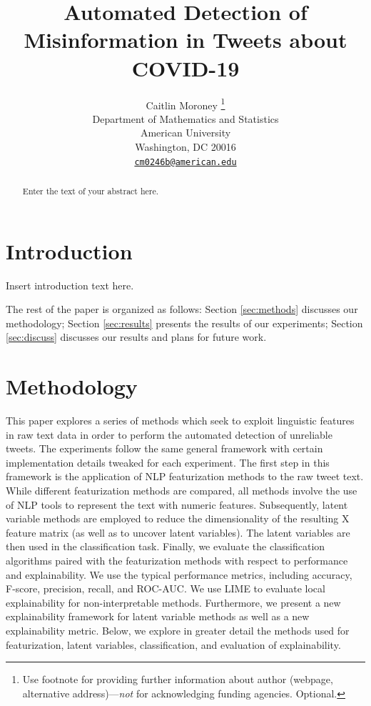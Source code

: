 \documentclass{article}
\title{Automated Detection of Misinformation in Tweets about COVID-19}
\author{
    Caitlin Moroney
    \thanks{Use footnote for providing further information about author (webpage,
alternative address)---\emph{not} for acknowledging funding agencies.
Optional.}
   \\
    Department of Mathematics and Statistics \\
    American University \\
  Washington, DC 20016 \\
  \texttt{\href{mailto:cm0246b@american.edu}{\nolinkurl{cm0246b@american.edu}}} \\
  }
\begin{document}
\maketitle

\def\tightlist{}


\begin{abstract}
Enter the text of your abstract here.
\end{abstract}


\hypertarget{introduction}{%
\section{Introduction}\label{introduction}}

Insert introduction text here.

The rest of the paper is organized as follows: Section \ref{sec:methods}
discusses our methodology; Section \ref{sec:results} presents the
results of our experiments; Section \ref{sec:discuss} discusses our
results and plans for future work.

\hypertarget{methodology}{%
\section{Methodology}\label{methodology}}

\label{sec:methods} This paper explores a series of methods which seek
to exploit linguistic features in raw text data in order to perform the
automated detection of unreliable tweets. The experiments follow the
same general framework with certain implementation details tweaked for
each experiment. The first step in this framework is the application of
NLP featurization methods to the raw tweet text. While different
featurization methods are compared, all methods involve the use of NLP
tools to represent the text with numeric features. Subsequently, latent
variable methods are employed to reduce the dimensionality of the
resulting X feature matrix (as well as to uncover latent variables). The
latent variables are then used in the classification task. Finally, we
evaluate the classification algorithms paired with the featurization
methods with respect to performance and explainability. We use the
typical performance metrics, including accuracy, F-score, precision,
recall, and ROC-AUC. We use LIME to evaluate local explainability for
non-interpretable methods. Furthermore, we present a new explainability
framework for latent variable methods as well as a new explainability
metric. Below, we explore in greater detail the methods used for
featurization, latent variables, classification, and evaluation of
explainability.
\end{document}
